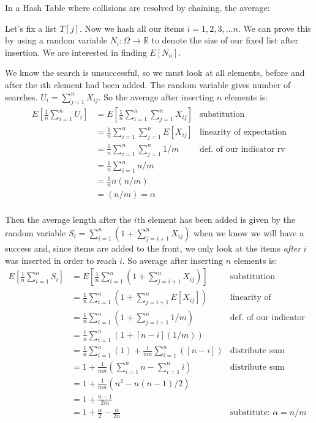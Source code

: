 \frmrule 

In a Hash Table where collisions are resolved by chaining, the average: 

\frmrule 

Let's fix a list $T[j]$. Now we hash all our items $i = 1,2,3, \ldots n$. 
We can prove this by using a random variable $N_i : \Omega \rightarrow \mathbb{R}$ 
to denote the size of our fixed list after insertion. We are interested in 
finding $E[N_n]$. 

We know the search is unsuccessful, so we must look at all 
elements, before and after the $i$th element had been added. 
The random variable gives number of searches.
$U_i = \sum^{n}_{j=1} X_{ij}$. So the average after inserting $n$ elements is:
%
\[ 
\begin{array}{lll}
 E[\frac{1}{n} \sum^{n}_{i=1} U_i] & = E[\frac{1}{n} \sum^{n}_{i=1} \sum^{n}_{j=1} X_{ij}] & \text{substitution} \\
  &= \frac{1}{n}\sum^{n}_{i=1} \sum^{n}_{j=1} E[X_{ij}]  & \text{linearity of expectation}\\
  &= \frac{1}{n}\sum^{n}_{i=1} \sum^{n}_{j=1} 1/m  & \text{def. of our indicator rv}\\
  &= \frac{1}{n}\sum^{n}_{i=1} n/m  &  \\
  &= \frac{1}{n} n (n/m)  &  \\
  &= (n/m) = \alpha & \\
\end{array}
\]
%


\frmrule 


Then the average length after the $i$th element has been added is given by the random variable
$S_i = \sum^{n}_{i=1} (1 + \sum^{n}_{j = i + 1} X_{ij})$ when we know we will 
have a success and, since items are added to the front, we only 
look at the items \textit{after} $i$ was inserted in order to reach $i$. 
So average after inserting $n$ elements is:
%
\[ 
\begin{array}{lll}
 E[\frac{1}{n} \sum^{n}_{i=1} S_i] & = E[\frac{1}{n} \sum^{n}_{i=1} (1 + \sum^{n}_{j = i + 1} X_{ij})] & \text{substitution} \\
  &= \frac{1}{n} \sum^{n}_{i=1} (1 + \sum^{n}_{j = i + 1} E[X_{ij}])  & \text{linearity of expectation}\\
  &= \frac{1}{n}\sum^{n}_{i=1} (1 + \sum^{n}_{j = i + 1} 1/m)  & \text{def. of our indicator rv}\\
  &= \frac{1}{n}\sum^{n}_{i=1} (1 + [n-i](1/m)) &  \\
  &= \frac{1}{n}\sum^{n}_{i=1} (1) + \frac{1}{mn}\sum^{n}_{i=1}([n-i]) & \text{distribute sum} \\
  &= 1 + \frac{1}{mn}(\sum^{n}_{i=1}n - \sum^{n}_{i=1}i) & \text{distribute sum} \\
  &= 1 + \frac{1}{mn}(n^2 - n(n-1)/2) & \\
  &= 1 + \frac{n-1}{2m} & \\
  &= 1 + \frac{\alpha}{2} - \frac{\alpha}{2n} & \text{substitute: } \alpha = n/m \\
\end{array}
\]
%

